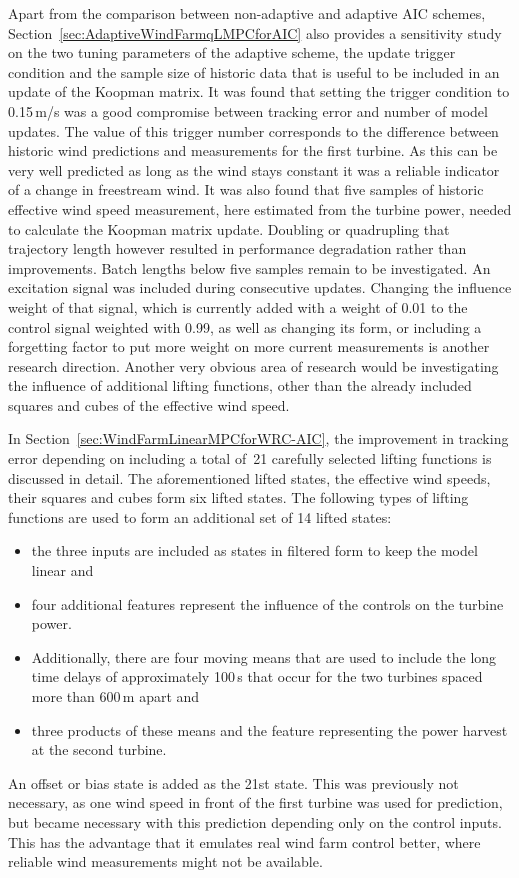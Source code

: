 Apart from the comparison between non-adaptive and adaptive AIC schemes, Section~\ref{sec:AdaptiveWindFarmqLMPCforAIC} also provides a sensitivity study on the two tuning parameters of the adaptive scheme, the update trigger condition and the sample size of historic data that is useful to be included in an update of the Koopman matrix. It was found that setting the trigger condition to 0.15\,m/s was a good compromise between tracking error and number of model updates. The value of this trigger number corresponds to the difference between historic wind predictions and measurements for the first turbine. As this can be very well predicted as long as the wind stays constant it was a reliable indicator of a change in freestream wind. It was also found that five samples of historic effective wind speed measurement, here estimated from the turbine power, needed to calculate the Koopman matrix update. Doubling or quadrupling that trajectory length however resulted in performance degradation rather than improvements. Batch lengths below five samples remain to be investigated. An excitation signal was included during consecutive updates. Changing the influence weight of that signal, which is currently added with a weight of 0.01 to the control signal weighted with 0.99, as well as changing its form, or including a forgetting factor to put more weight on more current measurements is another research direction. Another very obvious area of research would be investigating the influence of additional lifting functions, other than the already included squares and cubes of the effective wind speed.


In Section~\ref{sec:WindFarmLinearMPCforWRC-AIC}, the improvement in tracking error depending on including a total of~21 carefully selected lifting functions is discussed in detail. The aforementioned lifted states, the effective wind speeds, their squares and cubes form six lifted states. The following types of lifting functions are used to form an additional set of 14 lifted states: \begin{itemize}
    \item the three inputs are included as states in filtered form to keep the model linear and 
    \item four additional features represent the influence of the controls on the turbine power. 
    \item Additionally, there are four moving means that are used to include the long time delays of approximately 100\,s that occur for the two turbines spaced more than 600\,m apart and 
    \item three products of these means and the feature representing the power harvest at the second turbine.
\end{itemize}
An offset or bias state is added as the 21st state. This was previously not necessary, as one wind speed in front of the first turbine was used for prediction, but became necessary with this prediction depending only on the control inputs. This has the advantage that it emulates real wind farm control better, where reliable wind measurements might not be available. 

